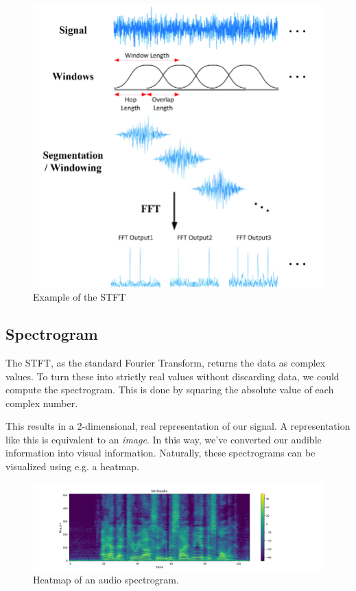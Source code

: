 \begin{figure}[H]
    \centering
    \includegraphics[scale=0.35]{figures/stft}
    \caption{Example of the \gls{STFT}}
    \label{STFTFigure}
\end{figure}

\subsection{Spectrogram}

The \gls{STFT}, as the standard Fourier Transform, returns the data as complex values. To turn these into strictly real values without discarding data, we could compute the spectrogram. This is done by squaring the absolute value of each complex number. 

This results in a 2-dimensional, real representation of our signal. A representation like this is equivalent to an \textit{image}. In this way, we've converted our audible information into visual information. Naturally, these spectrograms can be visualized using e.g. a heatmap.

\begin{figure}[H]
    \centering
    \includegraphics[scale=0.35]{figures/spectrogram}
    \caption{Heatmap of an audio spectrogram.}
    \label{SpectrogramFigure}
\end{figure}

